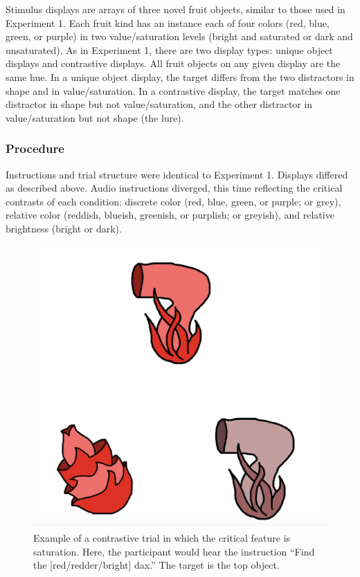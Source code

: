 \documentclass[10pt, letterpaper]{article}
\newenvironment{CodeChunk}{}{}
\begin{document}
Stimulus displays are arrays of three novel fruit objects, similar to
those used in Experiment 1. Each fruit kind has an instance each of four
colors (red, blue, green, or purple) in two value/saturation levels
(bright and saturated or dark and unsaturated). As in Experiment 1,
there are two display types: unique object displays and contrastive
displays. All fruit objects on any given display are the same hue. In a
unique object display, the target differs from the two distractors in
shape and in value/saturation. In a contrastive display, the target
matches one distractor in shape but not value/saturation, and the other
distractor in value/saturation but not shape (the lure).

\subsubsection{Procedure}\label{procedure}

Instructions and trial structure were identical to Experiment 1.
Displays differed as described above. Audio instructions diverged, this
time reflecting the critical contrasts of each condition: discrete color
(red, blue, green, or purple; or grey), relative color (reddish,
blueish, greenish, or purplish; or greyish), and relative brightness
(bright or dark).

\begin{CodeChunk}
\begin{figure}[H]

{\centering \includegraphics{figs/brightdarktrial-1} 

}

\caption[Example of a contrastive trial in which the critical feature is saturation]{Example of a contrastive trial in which the critical feature is saturation. Here, the participant would hear the instruction ``Find the [red/redder/bright] dax.'' The target is the top object.}\label{fig:brightdarktrial}
\end{figure}
\end{CodeChunk}
\end{document}
